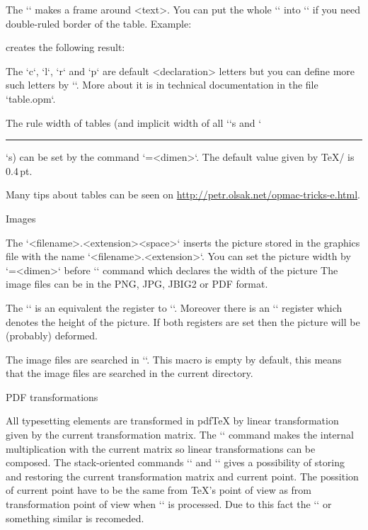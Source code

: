 {The `` makes a frame around <text>. You can put the whole `\table`
into `\frame` if you need double-ruled border of the table. Example:

\begtt
{}
\endtt
%
creates the following result:

\hfil{}
\bigskip

The `c`, `l`, `r` and `p` are default <declaration> letters but you can define
more such letters by `\def\tabdeclare<letter>{<left>##<right>}`. More about
it is in technical documentation in the file `table.opm`.

The rule width of tables (and implicit width of all `\vrule`s and `\hrule`s)
can be set by the command `=<dimen>`. The default value given 
by \TeX/ is 0.4\,pt.

Many tips about tables can be seen on
\url{http://petr.olsak.net/opmac-tricks-e.html}.


\sec Images

The `\inspic <filename>.<extension><space>` inserts the picture stored in
the graphics file  with the name `<filename>.<extension>`. 
You can set the picture width by `\picw=<dimen>`
before `\inspic` command which declares the width of the picture 
The image files can be in the PNG, JPG, JBIG2 or PDF format. 

The `\picwidth` is an equivalent the register to `\picw`. Moreover there is an
`\picheight` register which denotes the height of the picture. If both
registers are set then the picture will be (probably) deformed. 

The image files are searched in `\picdir`. This macro is empty by default, this
means that the image files are searched in the current directory.



\sec PDF transformations

All typesetting elements are transformed in pdf\TeX{} by linear
transformation given by the current transformation matrix. The
`` command makes the internal multiplication
with the current matrix so linear transformations can be composed. The
stack-oriented commands `\pdfsave` and `\pdfrestore` gives a possibility of
storing and restoring the current transformation matrix and current point.
The possition of current point have to be the same from \TeX{}'s point of
view as from transformation point of view when `\pdfrestore` is processed.
Due to this fact the `\pdfsave{}\pdfrestore` 
or something similar is recomeded.

}
